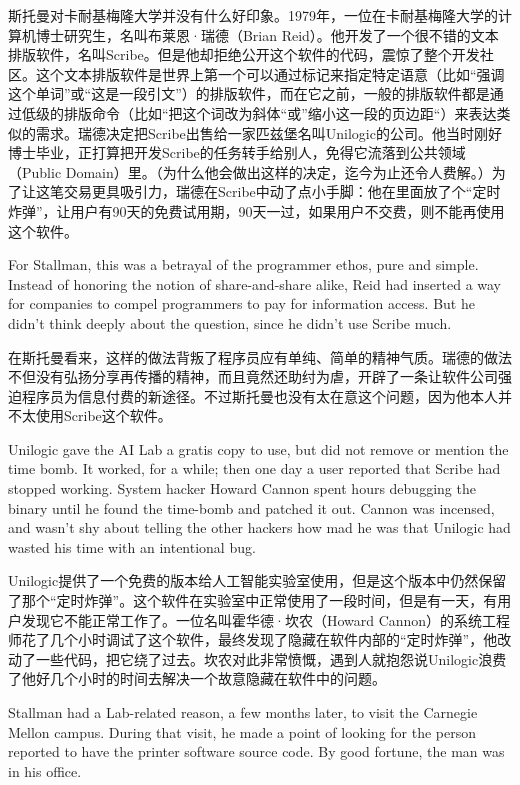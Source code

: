 \ifdefined\chs
斯托曼对卡耐基梅隆大学并没有什么好印象。1979年，一位在卡耐基梅隆大学的计算机博士研究生，名叫布莱恩·瑞德（Brian Reid）。他开发了一个很不错的文本排版软件，名叫Scribe。但是他却拒绝公开这个软件的代码，震惊了整个开发社区。这个文本排版软件是世界上第一个可以通过标记来指定特定语意（比如“强调这个单词”或“这是一段引文”）的排版软件，而在它之前，一般的排版软件都是通过低级的排版命令（比如“把这个词改为斜体“或”缩小这一段的页边距“）来表达类似的需求。瑞德决定把Scribe出售给一家匹兹堡名叫Unilogic的公司。他当时刚好博士毕业，正打算把开发Scribe的任务转手给别人，免得它流落到公共领域（Public Domain）里。（为什么他会做出这样的决定，迄今为止还令人费解。）为了让这笔交易更具吸引力，瑞德在Scribe中动了点小手脚：他在里面放了个“定时炸弹”，让用户有90天的免费试用期，90天一过，如果用户不交费，则不能再使用这个软件。
\fi

\ifdefined\eng
For Stallman, this was a betrayal of the programmer ethos, pure and simple. Instead of honoring the notion of share-and-share alike, Reid had inserted a way for companies to compel programmers to pay for information access.  But he didn't think deeply about the question, since he didn't use Scribe much.
\fi

\ifdefined\chs
在斯托曼看来，这样的做法背叛了程序员应有单纯、简单的精神气质。瑞德的做法不但没有弘扬分享再传播的精神，而且竟然还助纣为虐，开辟了一条让软件公司强迫程序员为信息付费的新途径。不过斯托曼也没有太在意这个问题，因为他本人并不太使用Scribe这个软件。
\fi

\ifdefined\eng
Unilogic gave the AI Lab a gratis copy to use, but did not remove or mention the time bomb.  It worked, for a while; then one day a user reported that Scribe had stopped working.  System hacker Howard Cannon spent hours debugging the binary until he found the time-bomb and patched it out.  Cannon was incensed, and wasn't shy about telling the other hackers how mad he was that Unilogic had wasted his time with an intentional bug.
\fi

\ifdefined\chs
Unilogic提供了一个免费的版本给人工智能实验室使用，但是这个版本中仍然保留了那个“定时炸弹”。这个软件在实验室中正常使用了一段时间，但是有一天，有用户发现它不能正常工作了。一位名叫霍华德·坎农（Howard Cannon）的系统工程师花了几个小时调试了这个软件，最终发现了隐藏在软件内部的“定时炸弹”，他改动了一些代码，把它绕了过去。坎农对此非常愤慨，遇到人就抱怨说Unilogic浪费了他好几个小时的时间去解决一个故意隐藏在软件中的问题。

\fi

\ifdefined\eng
Stallman had a Lab-related reason, a few months later, to visit the Carnegie Mellon campus. During that visit, he made a point of looking for the person reported to have the printer software source code.  By good fortune, the man was  in his office.
\fi

